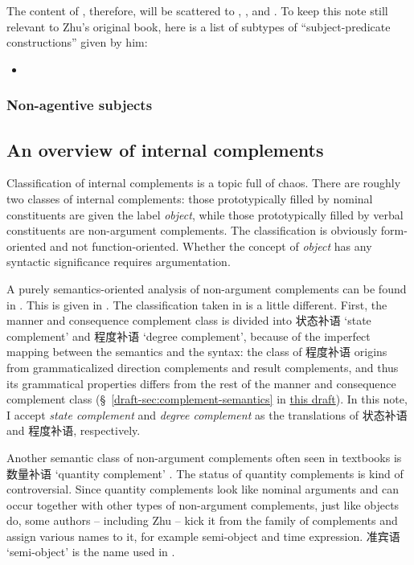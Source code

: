 \documentclass[UTF8, a4paper, oneside, scheme=plain]{ctexart}
\newcommand*{\citesec}[1]{\S~{#1}}
\newcommand*{\citechap}[1]{chap.~{#1}}
\newcommand*{\term}[1]{\emph{#1}}
\newcommand{\draft}{\href{./main.pdf}{this draft}}
\newcommand{\translate}[1]{`#1'}
\begin{document}
The content of \citet[\citechap{7}]{zhudexigrammar},
therefore, will be scattered to 
, , and . 
To keep this note still relevant to Zhu's original book,
here is a list of subtypes of ``subject-predicate constructions'' given by him:
\begin{itemize}
    \item 
\end{itemize}

\subsubsection{Non-agentive subjects}

\subsection{An overview of internal complements}



Classification of internal complements is a topic full of chaos.
There are roughly two classes of internal complements:
those prototypically filled by nominal constituents are given the label \term{object},
while those prototypically filled by verbal constituents are non-argument complements.
The classification is obviously form-oriented and not function-oriented.
Whether the concept of \term{object} has any syntactic significance requires argumentation. %

A purely semantics-oriented analysis of non-argument complements 
can be found in .
This is given in \cite[5.8]{xianhan2004}.
The classification taken in \citet{zhudexigrammar} is a little different.
First, the manner and consequence complement class 
is divided into 状态补语 \translate{state complement}
and 程度补语 \translate{degree complement},
because of the imperfect mapping 
between the semantics and the syntax: 
the class of 程度补语 origins from grammaticalized direction complements and result complements,
and thus its grammatical properties differs from the rest of the manner and consequence complement class
(\citesec{\ref{draft-sec:complement-semantics}} in \draft).
In this note, I accept \term{state complement} and \term{degree complement}
as the translations of 状态补语 and 程度补语, respectively.

Another semantic class of non-argument complements often seen in textbooks is 
数量补语 \translate{quantity complement} \citep[\citesec{7.1}]{zhuqingming2005}.
The status of quantity complements  is kind of controversial.
Since quantity complements look like nominal arguments 
and can occur together with other types of non-argument complements, 
just like objects do, some authors -- including Zhu -- 
kick it from the family of complements and assign various names to it, 
for example semi-object and time expression. 
准宾语 \translate{semi-object} is the name used in \citet{zhudexigrammar}. %
\end{document}
